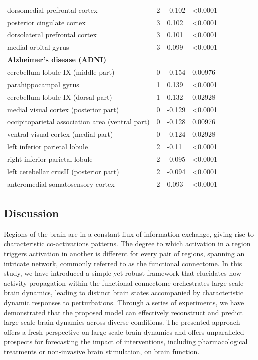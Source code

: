 \documentclass{article}
\begin{document}
\begin{table}
\begin{tabular}{p{}p{}p{}p{}}
dorsomedial prefrontal cortex & 2 & -0.102 & \textless 0.0001 \\
posterior cingulate cortex & 3 & 0.102 & \textless 0.0001 \\
dorsolateral prefrontal cortex & 3 & 0.101 & \textless 0.0001 \\
medial orbital gyrus & 3 & 0.099 & \textless 0.0001 \\
\textbf{Alzheimer's disease (ADNI)} &  &  &  \\
cerebellum lobule IX (middle part) & 0 & -0.154 & 0.00976 \\
parahippocampal gyrus & 1 & 0.139 & \textless 0.0001 \\
cerebellum lobule IX (dorsal part) & 1 & 0.132 & 0.02928 \\
medial visual cortex (posterior part) & 0 & -0.129 & \textless 0.0001 \\
occipitoparietal association area (ventral part) & 0 & -0.128 & 0.00976 \\
ventral visual cortex (medial part) & 0 & -0.124 & 0.02928 \\
left inferior parietal lobule & 2 & -0.11 & \textless 0.0001 \\
right inferior parietal lobule & 2 & -0.095 & \textless 0.0001 \\
left cerebellar crusII (posterior part) & 2 & -0.094 & \textless 0.0001 \\
anteromedial somatosensory cortex & 2 & 0.093 & \textless 0.0001 \\
\bottomrule
\end{tabular}
\end{table}

\subsection{Discussion}\label{Discussion}

Regions of the brain are in a constant flux of information exchange, giving rise to characteristic co-activations patterns.
The degree to which activation in a region triggers activation in another is different for every pair of regions, spanning an intricate network, commonly referred to as the functional connectome.
In this study, we have introduced a simple yet robust framework that elucidates how activity propagation within the functional connectome orchestrates large-scale brain dynamics, leading to distinct brain states accompanied by characteristic dynamic responses to perturbations.
Through a series of experiments, we have demonstrated that the proposed model can effectively reconstruct and predict large-scale brain dynamics across diverse conditions.
The presented approach offers a fresh perspective on large scale brain dynamics and offers unparalleled prospects for forecasting the impact of interventions, including pharmacological treatments or non-invasive brain stimulation, on brain function.
\end{document}
